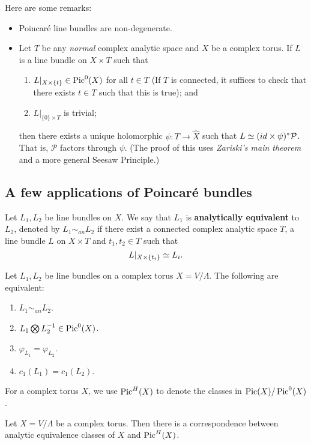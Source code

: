 Here are some remarks:
\begin{itemize}
\item Poincar\'{e} line bundles are non-degenerate.
\item Let $T$ be any \emph{normal} complex analytic space and $X$ be a complex torus. If $L$ is a line bundle on $X\times T$ such that 
\begin{enumerate}
\item $L|_{X\times \{t\}}\in \operatorname{Pic}^0(X)$ for all $t\in T$ (If $T$ is connected, it suffices to check that there exists $t\in T$ such that this is true); and
\item $L|_{\{0\}\times T}$ is trivial;
\end{enumerate} 

then there exists a unique holomorphic $\psi: T\to \hat{X}$ such that $L\simeq (id\times \psi)^* \mathcal{P}$. That is, $\mathcal{P}$ factors through $\psi$. (The proof of this uses \emph{Zariski's main theorem} and a more general Seesaw Principle.)

\end{itemize}

\subsection{A few applications of Poincar\'{e} bundles}

Let $L_1,L_2$ be line bundles on $X$. We say that $L_1$ is \textbf{analytically equivalent} to $L_2$, denoted by $L_1\sim_{an} L_2$ if there exist a connected complex analytic space $T$, a line bundle $L$ on $X\times T$ and $t_1,t_2\in T$ such that 
$$L|_{X\times \{t_i\}}\simeq L_i.$$

\begin{proposition}
Let $L_1,L_2$ be line bundles on a complex torus $X=V/\Lambda$.
The following are equivalent:
\begin{enumerate}
\item $L_1\sim_{an} L_2$.
\item $L_1\bigotimes L_2^{-1}\in \operatorname{Pic}^0(X)$.
\item $\varphi_{L_1}=\varphi_{L_2}$.
\item $c_1(L_1)=c_1(L_2)$.
\end{enumerate}

\end{proposition}

For a complex torus $X$, we use $\operatorname{Pic}^H(X)$ to denote the classes in $\operatorname{Pic}(X)/\operatorname{Pic}^0(X)$.

\begin{corollary}
Let $X=V/\Lambda$ be a complex torus. Then
there is a correspondence between analytic equivalence classes of $X$ and $\operatorname{Pic}^H(X)$.
\end{corollary}

